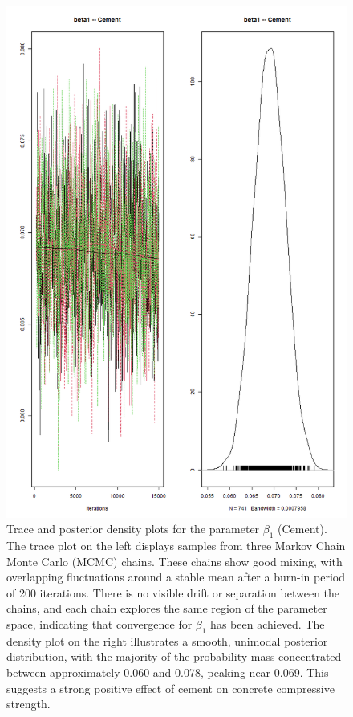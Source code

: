 \documentclass[]{article}
\begin{document}
\begin{figure}[H]
	\centering
	\includegraphics[width=0.7\linewidth]{img/img-trace-beta1}
	\caption{Trace and posterior density plots for the parameter $\beta_1$ (Cement). The trace plot on the left displays samples from three Markov Chain Monte Carlo (MCMC) chains. These chains show good mixing, with overlapping fluctuations around a stable mean after a burn-in period of 200 iterations. There is no visible drift or separation between the chains, and each chain explores the same region of the parameter space, indicating that convergence for $\beta_1$ has been achieved. The density plot on the right illustrates a smooth, unimodal posterior distribution, with the majority of the probability mass concentrated between approximately 0.060 and 0.078, peaking near 0.069. This suggests a strong positive effect of cement on concrete compressive strength.}
	\label{fig:img-trace-beta1}
\end{figure}
\end{document}
